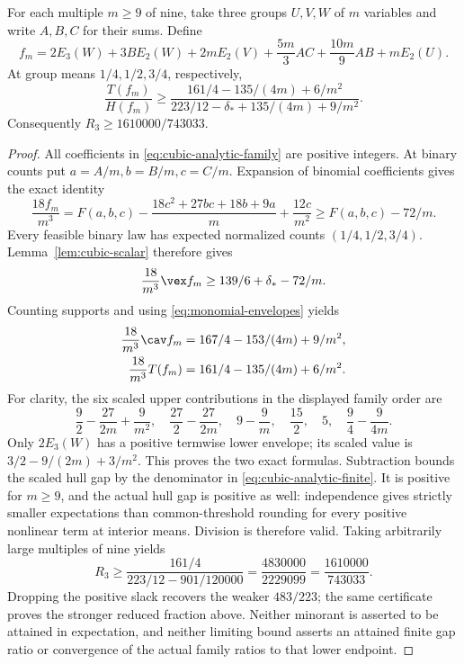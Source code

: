 \begin{theorem}\label{thm:cubic-analytic}
For each multiple $m\ge9$ of nine, take three groups $U,V,W$ of $m$
variables and write $A,B,C$ for their sums. Define
\begin{equation}\label{eq:cubic-analytic-family}
 f_m=2E_3(W)+3B E_2(W)+2mE_2(V)
       +\frac{5m}{3}AC+\frac{10m}{9}AB+mE_2(U).
\end{equation}
At group means $1/4,1/2,3/4$, respectively,
\begin{equation}\label{eq:cubic-analytic-finite}
 \frac{T(f_m)}{H(f_m)}\ge
 \frac{161/4-135/(4m)+6/m^2}
 {223/12-\delta_*+135/(4m)+9/m^2}.
\end{equation}
Consequently $R_3\ge1610000/743033$.
\end{theorem}
\begin{proof}
All coefficients in \eqref{eq:cubic-analytic-family} are positive integers.
At binary counts put $a=A/m,b=B/m,c=C/m$. Expansion of binomial
coefficients gives the exact identity
\begin{equation}\label{eq:cubic-count-expansion}
 \frac{18f_m}{m^3}=F(a,b,c)
 -\frac{18c^2+27bc+18b+9a}{m}+\frac{12c}{m^2}
 \ge F(a,b,c)-72/m.
\end{equation}
Every feasible binary law has expected normalized counts
$(1/4,1/2,3/4)$. Lemma~\ref{lem:cubic-scalar} therefore gives
\[
 \frac{18}{m^3}\vex f_m\ge139/6+\delta_*-72/m.
\]
Counting supports and using \eqref{eq:monomial-envelopes} yields
\begin{align}
 \frac{18}{m^3}\cav f_m&=167/4-153/(4m)+9/m^2,
       \label{eq:cubic-analytic-cav}\\
 \frac{18}{m^3}T(f_m)&=161/4-135/(4m)+6/m^2.
       \label{eq:cubic-analytic-tgap}
\end{align}
For clarity, the six scaled upper contributions in the displayed family
order are
\[
 \frac92-\frac{27}{2m}+\frac9{m^2},\quad
 \frac{27}2-\frac{27}{2m},\quad
 9-\frac9m,\quad\frac{15}2,\quad5,\quad
 \frac94-\frac9{4m}.
\]
Only $2E_3(W)$ has a positive termwise lower envelope; its scaled value
is $3/2-9/(2m)+3/m^2$. This proves the two exact formulas. Subtraction
bounds the scaled hull gap by the denominator in
\eqref{eq:cubic-analytic-finite}. It is positive for $m\ge9$, and the
actual hull gap is positive as well: independence gives strictly smaller
expectations than common-threshold rounding for every positive nonlinear
term at interior means. Division is therefore valid. Taking arbitrarily
large multiples of nine yields
\[
 R_3\ge\frac{161/4}{223/12-901/120000}
       =\frac{4830000}{2229099}=\frac{1610000}{743033}.
\]
Dropping the positive slack recovers the weaker $483/223$; the same
certificate proves the stronger reduced fraction above. Neither minorant
is asserted to be attained in expectation, and neither limiting bound
asserts an attained finite gap ratio or convergence of the actual family
ratios to that lower endpoint.
\end{proof}

